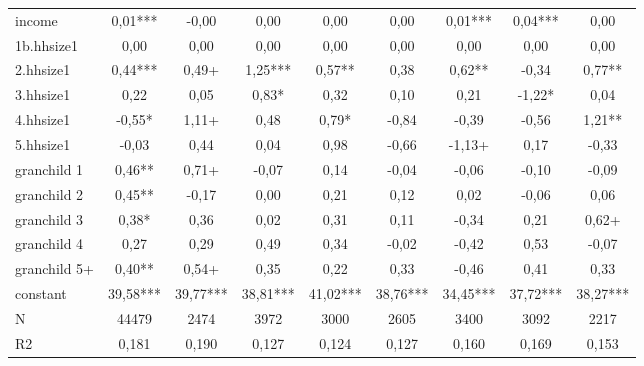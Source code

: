{\begin{tabular}{l*{8}{c}}
income      &        0,01***&       -0,00   &        0,00   &        0,00   &        0,00   &        0,01***&        0,04***&        0,00   \\
1b.hhsize1  &        0,00   &        0,00   &        0,00   &        0,00   &        0,00   &        0,00   &        0,00   &        0,00   \\
2.hhsize1   &        0,44***&        0,49+  &        1,25***&        0,57** &        0,38   &        0,62** &       -0,34   &        0,77** \\
3.hhsize1   &        0,22   &        0,05   &        0,83*  &        0,32   &        0,10   &        0,21   &       -1,22*  &        0,04   \\
4.hhsize1   &       -0,55*  &        1,11+  &        0,48   &        0,79*  &       -0,84   &       -0,39   &       -0,56   &        1,21** \\
5.hhsize1   &       -0,03   &        0,44   &        0,04   &        0,98   &       -0,66   &       -1,13+  &        0,17   &       -0,33   \\
granchild 1 &        0,46** &        0,71+  &       -0,07   &        0,14   &       -0,04   &       -0,06   &       -0,10   &       -0,09   \\
granchild 2 &        0,45** &       -0,17   &        0,00   &        0,21   &        0,12   &        0,02   &       -0,06   &        0,06   \\
granchild 3 &        0,38*  &        0,36   &        0,02   &        0,31   &        0,11   &       -0,34   &        0,21   &        0,62+  \\
granchild 4 &        0,27   &        0,29   &        0,49   &        0,34   &       -0,02   &       -0,42   &        0,53   &       -0,07   \\
granchild 5+&        0,40** &        0,54+  &        0,35   &        0,22   &        0,33   &       -0,46   &        0,41   &        0,33   \\
constant    &       39,58***&       39,77***&       38,81***&       41,02***&       38,76***&       34,45***&       37,72***&       38,27***\\
\hline
N           &       44479   &        2474   &        3972   &        3000   &        2605   &        3400   &        3092   &        2217   \\
R2          &       0,181   &       0,190   &       0,127   &       0,124   &       0,127   &       0,160   &       0,169   &       0,153   \\
\hline\hline
\end{tabular}
}
